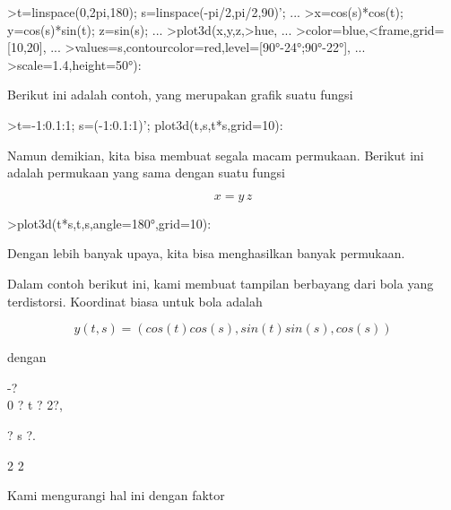 \documentclass{article}
\begin{document}
\begin{eulernotebook}
\begin{eulercomment}
\begin{eulercomment}
\begin{eulercomment}
\end{eulercomment}
\begin{eulerprompt}
>t=linspace(0,2pi,180); s=linspace(-pi/2,pi/2,90)'; ...
>x=cos(s)*cos(t); y=cos(s)*sin(t); z=sin(s); ...
>plot3d(x,y,z,>hue, ...
>color=blue,<frame,grid=[10,20], ...
>values=s,contourcolor=red,level=[90°-24°;90°-22°], ...
>scale=1.4,height=50°):
\end{eulerprompt}
\begin{eulercomment}
Berikut ini adalah contoh, yang merupakan grafik suatu fungsi
\end{eulercomment}
\begin{eulerprompt}
>t=-1:0.1:1; s=(-1:0.1:1)'; plot3d(t,s,t*s,grid=10):
\end{eulerprompt}
\begin{eulercomment}
Namun demikian, kita bisa membuat segala macam permukaan. Berikut ini
adalah permukaan yang sama dengan suatu fungsi

\end{eulercomment}
\begin{eulerformula}
\[
x = y \, z
\]
\end{eulerformula}
\begin{eulerprompt}
>plot3d(t*s,t,s,angle=180°,grid=10):
\end{eulerprompt}
\begin{eulercomment}
Dengan lebih banyak upaya, kita bisa menghasilkan banyak permukaan.

Dalam contoh berikut ini, kami membuat tampilan berbayang dari bola
yang terdistorsi. Koordinat biasa untuk bola adalah

\end{eulercomment}
\begin{eulerformula}
\[
y(t, s) = (cos(t) cos(s), sin(t) sin(s), cos(s))
\]
\end{eulerformula}
\begin{eulercomment}
dengan

-?\\
0 ? t ? 2?,

? s  ?.

2   2


Kami mengurangi hal ini dengan faktor


\end{eulercomment}
\end{eulercomment}
\end{eulercomment}
\end{eulernotebook}
\end{document}
